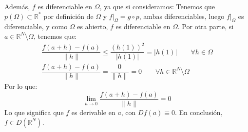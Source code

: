 \begin{ejercicio}
    \noindent
    Además, $f$ es diferenciable en $\Omega$, ya que si consideramos:
    Tenemos que $p(\Omega) \subset \mathbb{R}^\ast$ por definición de $\Omega$ y $f\big|_\Omega = g\circ p$, ambas diferenciables, luego $f\big|_\Omega$ es diferenciable, y como $\Omega$ es abierto, $f$ es diferenciable en $\Omega$. Por otra parte, si $a\in \mathbb{R}^N\setminus\Omega$, tenemos que:
    \begin{gather*}
        \dfrac{f(a+h)-f(a)}{\|h\|} \leq \dfrac{{(h(1))}^{2}}{|h(1)|} = |h(1)| \qquad \forall h\in \Omega \\
        \dfrac{f(a+h)-f(a)}{\|h\|} = \dfrac{0}{\|h\|} = 0 \qquad \forall h\in \mathbb{R}^N\setminus \Omega
    \end{gather*}
    Por lo que:
    \begin{equation*}
        \lim_{h\to0}\dfrac{f(a+h)-f(a)}{\|h\|} = 0
    \end{equation*}
    Lo que significa que $f$ es derivable en $a$, con $Df(a) \equiv 0$. En conclusión, $f\in D(\mathbb{R}^N)$.\\


\end{ejercicio}
